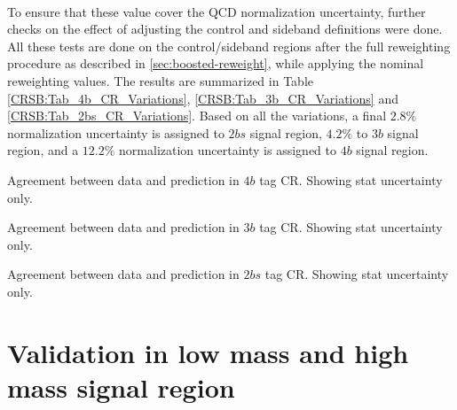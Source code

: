 \paragraph{}
To ensure that these value cover the QCD normalization uncertainty, further checks on the effect of adjusting the control and sideband definitions were done. 
All these tests are done on the control/sideband regions after the full reweighting procedure as described in \ref{sec:boosted-reweight}, while applying the nominal reweighting values.
The results are summarized in Table \ref{CRSB:Tab_4b_CR_Variations}, \ref{CRSB:Tab_3b_CR_Variations} and \ref{CRSB:Tab_2bs_CR_Variations}. 
Based on all the variations, a final $2.8\%$ normalization uncertainty is assigned to $2bs$ signal region, $4.2\%$ to $3b$ signal region, and a $12.2\%$ normalization uncertainty is assigned to $4b$ signal region.

\begin{table}[htbp!]
\begin{center}

\end{center}
\caption{Agreement between data and prediction in $4b$ tag CR. Showing stat uncertainty only.}
\label{CRSB:Tab_4b_CR_Variations}
\end{table}

\begin{table}[htbp!]
\begin{center}

\end{center}
\caption{Agreement between data and prediction in $3b$ tag CR. Showing stat uncertainty only.}
\label{CRSB:Tab_3b_CR_Variations}
\end{table}
\begin{table}[htbp!]
\begin{center}

\end{center}
\caption{Agreement between data and prediction in $2bs$ tag CR. Showing stat uncertainty only.}
\label{CRSB:Tab_2bs_CR_Variations}
\end{table}


\section{Validation in low mass and high mass signal region}
\label{sec:boosted-ZZ-Rehearsal}
